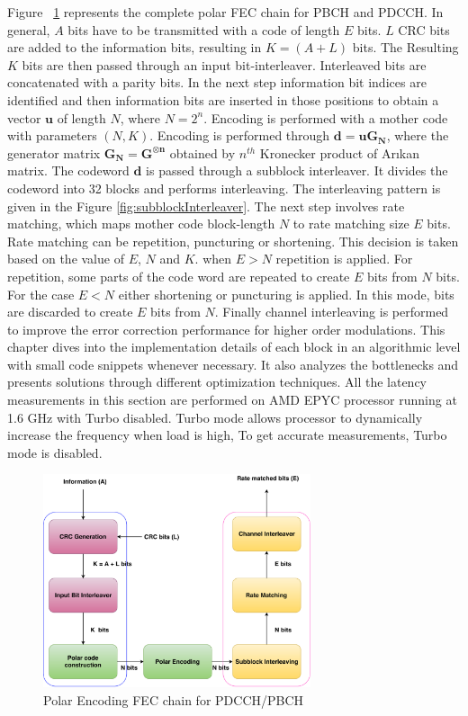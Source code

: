 Figure ~\ref{fig:5g_txfec_chain} represents the complete polar FEC chain for PBCH and PDCCH. In general, $A$ bits have to be transmitted with a code of length $E$ bits. $L$ CRC bits are added to the information bits, resulting in  $K = (A + L)$ bits. The Resulting $K$ bits are then passed through an input bit-interleaver. Interleaved bits are concatenated with a parity bits. In the next step information bit indices are identified and then information bits are inserted in those positions to obtain a vector $\boldsymbol{u}$ of length $N$, where $N = 2^{n}$. Encoding is performed with a mother code with parameters $(N,K)$. Encoding is performed through $\boldsymbol{d = uG_{N}}$, where the generator matrix $\boldsymbol{G_{N} = G^{\otimes n}}$ obtained by $n^{th}$ Kronecker product of Ar\i kan matrix. The codeword $\boldsymbol{d}$ is passed through a subblock interleaver. It divides the codeword into 32 blocks and performs interleaving. The interleaving pattern is given in the Figure \ref{fig:subblockInterleaver}. The next step involves rate matching, which maps mother code block-length $N$ to rate matching size $E$ bits. Rate matching can be repetition, puncturing or shortening.  This decision is taken based on the value of $E$, $N$ and $K$. when $E > N$ repetition is applied. For repetition, some parts of the code word are repeated to create $E$ bits from $N$ bits. For the case $E < N$ either shortening or puncturing is applied. In this mode, bits are discarded to create $E$ bits from $N$. Finally channel interleaving is performed to improve the error correction performance for higher order modulations. This chapter dives into  the implementation details of each block in an algorithmic level with small code snippets whenever necessary. It also analyzes the bottlenecks and presents solutions through different optimization techniques. All the latency measurements in this section are performed on AMD EPYC processor running at 1.6 GHz with Turbo disabled. Turbo mode allows processor to dynamically increase the frequency when load is high, To get accurate measurements, Turbo mode is disabled.


\begin{figure}[h]
	\centering
	\includegraphics[width=0.7\textwidth]{./figures/5GFECChain.pdf}
	\caption{Polar Encoding FEC chain for PDCCH/PBCH}
	\label{fig:5g_txfec_chain}
\end{figure}

